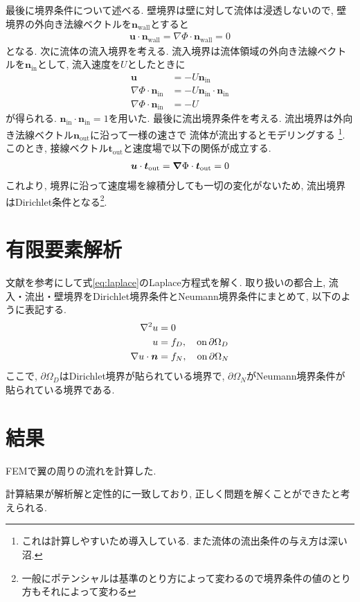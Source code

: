 \documentclass{ltjsarticle}
\begin{document}
最後に境界条件について述べる.
壁境界は壁に対して流体は浸透しないので, 
壁境界の外向き法線ベクトルを$\bm{n}_\mathrm{wall}$とすると
\begin{align}
    \bm{u}\cdot\bm{n}_\mathrm{wall} = \nabla\Phi\cdot\bm{n}_\mathrm{wall} =0
\end{align}
となる.
次に流体の流入境界を考える.
流入境界は流体領域の外向き法線ベクトルを$\bm{n}_\mathrm{in}$として, 流入速度を$U$としたときに
\begin{align}
    \bm{u} &= -U\bm{n}_\mathrm{in} \\  
    \nabla\Phi \cdot \bm{n}_\mathrm{in} &= -U\bm{n}_\mathrm{in} \cdot \bm{n}_\mathrm{in} \\
    \nabla\Phi \cdot \bm{n}_\mathrm{in} &= -U
\end{align}
が得られる. $\bm{n}_\mathrm{in} \cdot \bm{n}_\mathrm{in} =1$を用いた.
最後に流出境界条件を考える. 
流出境界は外向き法線ベクトル$\bm{n}_\mathrm{out}$に沿って一様の速さで
流体が流出するとモデリングする
\footnote{これは計算しやすいため導入している. また流体の流出条件の与え方は深い沼.}.
このとき, 接線ベクトル$\bm{t}_\mathrm{out}$と速度場で以下の関係が成立する.
\begin{align}
    \bm{u}\cdot\bm{t}_\mathrm{out} =  \grad\Phi\cdot\bm{t}_\mathrm{out} =0
\end{align}
これより, 境界に沿って速度場を線積分しても一切の変化がないため,
流出境界はDirichlet条件となる\footnote{一般にポテンシャルは基準のとり方によって変わるので境界条件の値のとり方もそれによって変わる}.

\section{有限要素解析}
文献\cite{Larson2013}を参考にして式\eqref{eq:laplace}のLaplace方程式を解く.
取り扱いの都合上, 流入・流出・壁境界をDirichlet境界条件とNeumann境界条件にまとめて,
以下のように表記する.
\begin{align}
    \laplacian u &= 0 \label{eq:gov} \\
    u &= f_D,\quad \mathrm{on}\,\partial \Omega_D \label{eq:dirichlet_bc} \\
    \nabla u\cdot\bm{n} &= f_N,\quad \mathrm{on}\,\partial \Omega_N \label{eq:neumann_bc} 
\end{align}
ここで, $\partial\Omega_D$はDirichlet境界が貼られている境界で, 
$\partial\Omega_N$がNeumann境界条件が貼られている境界である.

\section{結果}
FEMで翼の周りの流れを計算した.


計算結果が解析解と定性的に一致しており, 正しく問題を解くことができたと考えられる.
\printbibliography[title=参考文献]
\end{document}
